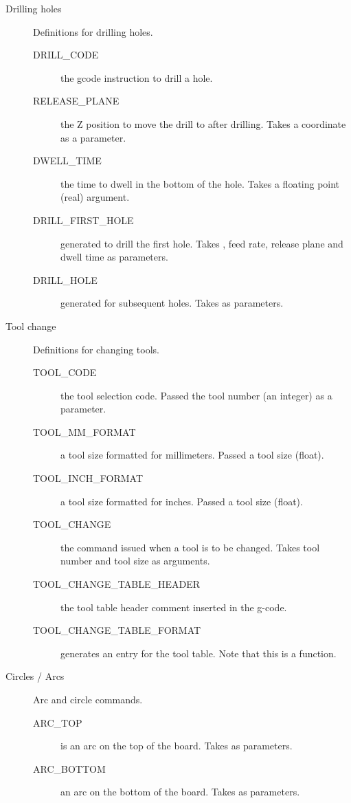 \documentclass[11pt]{book}
\begin{document}
\begin{description}
\item[Drilling holes] Definitions for drilling holes.
\begin{description}
	\item[DRILL\_{}CODE] the gcode instruction to drill a hole.
	\item[RELEASE\_{}PLANE] the Z position to move the drill to after drilling. Takes a  coordinate as a parameter.
	\item[DWELL\_{}TIME] the time to dwell in the bottom of the hole. Takes a floating point (real) argument.
	\item[DRILL\_{}FIRST\_{}HOLE] generated to drill the first hole. Takes , feed rate, release  plane and dwell time as parameters.
	\item[DRILL\_{}HOLE] generated for subsequent holes. Takes  as parameters.
\end{description}

\item[Tool change] Definitions for changing tools.
\begin{description}
	\item[TOOL\_{}CODE] the tool selection code. Passed the tool number (an integer) as a parameter.
	\item[TOOL\_{}MM\_{}FORMAT] a tool size formatted for millimeters. Passed a tool size (float).
	\item[TOOL\_{}INCH\_{}FORMAT] a tool size formatted for inches. Passed a tool size (float).
	\item[TOOL\_{}CHANGE] the command issued when a tool is to be changed. Takes tool number and tool size as arguments.
	\item[TOOL\_{}CHANGE\_{}TABLE\_{}HEADER] the tool table header comment inserted in the g-code.
	\item[TOOL\_{}CHANGE\_{}TABLE\_{}FORMAT] generates an entry for the tool table. Note that this is a function.
\end{description}

\item[Circles / Arcs] Arc and circle commands.
\begin{description}
	\item[ARC\_{}TOP] is an arc on the top of the board. Takes  as parameters.
	\item[ARC\_{}BOTTOM] an arc on the bottom of the board. Takes  as parameters.
\end{description}
\end{description}
\end{document}
